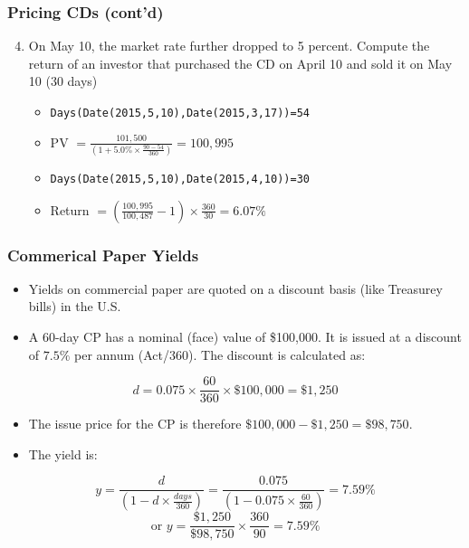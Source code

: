 \documentclass[10pt]{beamer}
\begin{document}
	
	
	\begin{frame}
		\frametitle{Pricing CDs (cont'd)}
		
		\begin{enumerate} \setcounter{enumi}{3} \itemsep10pt
			
			\item On May 10, the market rate further dropped to 5 percent. Compute the return of an investor that purchased the CD on April 10 and sold it on May 10 (30 days)
			\begin{itemize}
				\item \texttt{Days(Date(2015,5,10),Date(2015,3,17))=54} \vspace{5pt}
				
				\item PV $ = \frac{101,500}{\left( 1+ 5.0\% \times \frac{90-54}{360} \right)}  = 100,995 $ \vspace{5pt}
				
				\item \texttt{Days(Date(2015,5,10),Date(2015,4,10))=30} \vspace{5pt}
				
				\item Return $ = \left( \frac{100,995}{100,487} -1 \right) \times \frac{360}{30} = 6.07 \% $
			\end{itemize}		
			
		\end{enumerate}
		
		
		
	\end{frame}
	
	
	
	
	\begin{frame}
		\frametitle{Commerical Paper Yields}
		
		\begin{itemize}
			\item Yields on commercial paper are quoted on a discount basis (like Treasurey bills) in the U.S. 
			
			\item A 60-day CP has a nominal (face) value of \$100,000. It is issued at a discount of $7.5\%$ per annum (Act/360). The discount is calculated as:
		\end{itemize}	
		$$
		d = 0.075 \times \frac{60}{360} \times \$100,000 = \$1,250
		$$
		\begin{itemize}
			\item The issue price for the CP is therefore $\$100,000 - \$1,250 = \$98,750 $.
			\item The yield is:
		\end{itemize}
		$$
		y = \frac{d}{\left( 1 - d \times \frac{days}{360} \right) } = \frac{0.075}{\left( 1- 0.075 \times \frac{60}{360} \right) } = 7.59\%
		$$
		$$ 
		\text{or  } y = \frac{\$1,250}{\$98,750} \times \frac{360}{90} = 7.59\%
		$$
		
	\end{frame}
	
\end{document}
